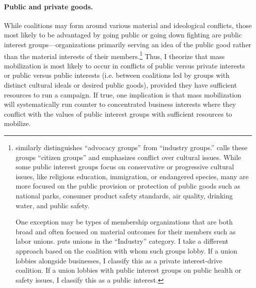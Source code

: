 \begin{subhyp}

\paragraph{Public and private goods.} While coalitions may form around various material and ideological conflicts, those most likely to be advantaged by going public or going down fighting are public interest groups---organizations primarily serving an idea of the public good rather than the material interests of their members.\footnote{\citet{Potter2017} similarly distinguishes ``advocacy groups'' from ``industry groups.'' \citet{Berry1999} calls these groups ``citizen groups'' and emphasizes conflict over cultural issues. While some public interest groups focus on conservative or progressive cultural issues, like religious education, immigration, or endangered species, many are more focused on the public provision or protection of public goods such as national parks, consumer product safety standards, air quality, drinking water, and public safety.

One exception may be types of membership organizations that are both broad and often focused on material outcomes for their members such as labor unions. \citet{Potter2017} puts unions in the ``Industry'' category. I take a different approach based on the coalition with whom such groups lobby. If a union lobbies alongside businesses, I classify this as a private interest-drive coalition. If a union lobbies with public interest groups on public health or safety issues, I classify this as a public interest.} Thus, I theorize that mass mobilization is most likely to occur in conflicts of public versus private interests or public versus public interests (i.e. between coalitions led by groups with distinct cultural ideals or desired public goods), provided they have sufficient resources to run a campaign.
If true, one implication is that mass mobilization will systematically run counter to concentrated business interests where they conflict with the values of public interest groups with sufficient resources to mobilize.



\end{subhyp}
